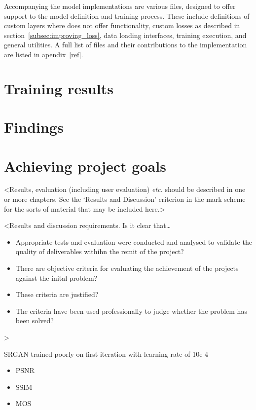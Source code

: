Accompanying the model implementations are various  files, designed to offer support to the model definition and training process. These include definitions of custom layers where  does not offer functionality, custom losses as described in section~\ref{subsec:improving_loss}, data loading interfaces, training execution, and general utilities. A full list of  files and their contributions to the implementation are listed in apendix~\ref{ref}.

\section{Training results}

\section{Findings}

\section{Achieving project goals}

<Results, evaluation (including user evaluation) {\em etc.} should be described in one or more chapters. See the `Results and Discussion' criterion in the mark scheme for the sorts of material that may be included here.>

<Results and discussion requirements. Is it clear that\dots
\begin{itemize}
    \item Appropriate tests and evaluation were conducted and analysed to validate the quality of deliverables withihn the remit of the project?
    \item There are objective criteria for evaluating the achievement of the projects against the inital problem?
    \item These criteria are justified?
    \item The criteria have been used professionally to judge whether the problem has been solved?
\end{itemize}
>

SRGAN trained poorly on first iteration with learning rate of 10e-4
\begin{itemize}
    \item PSNR
    \item SSIM
    \item MOS
\end{itemize}

